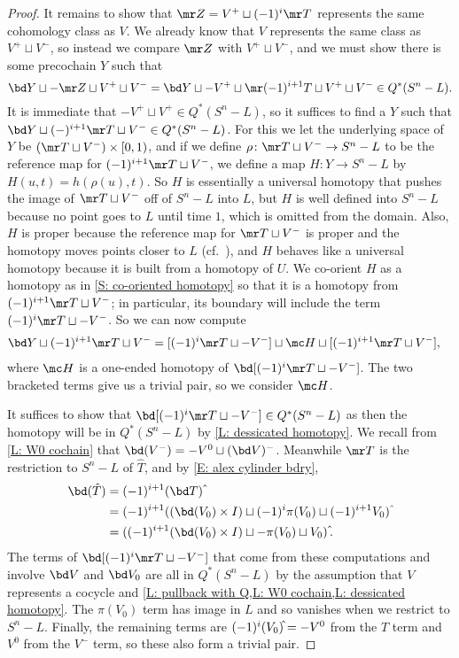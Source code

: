 \begin{example}
\begin{proof}
	It remains to show that $\mr Z = V^+ \sqcup (-1)^i\mr T$ represents the same cohomology class as $V$.
	We already know that $V$ represents the same class as $V^+ \sqcup V^-$, so instead we compare $\mr Z$ with $V^+ \sqcup V^-$, and we must show there is some precochain $Y$ such that
	$$\bd Y \sqcup -\mr Z\sqcup V^+\sqcup V^- = \bd Y \sqcup -V^+ \sqcup \mr (-1)^{i+1}T \sqcup V^+ \sqcup V^- \in Q^*(S^n-L).$$
	It is immediate that $-V^+ \sqcup V^+ \in Q^*(S^n-L)$, so it suffices to find a $Y$ such that
	$\bd Y \sqcup (-)^{i+1} \mr T \sqcup V^- \in Q^*(S^n-L)$.
	For this we let the underlying space of $Y$ be $(\mr T \sqcup V^-) \times [0,1)$, and if we define $\rho \colon \mr T \sqcup V^- \to S^n -L$ to be the reference map for $(-1)^{i+1}\mr T \sqcup V^-$, we define a map $H \colon Y \to S^n-L$ by $H(u,t) = h(\rho(u),t)$.
	So $H$ is essentially a universal homotopy that pushes the image of $\mr T \sqcup V^-$ off of $S^n-L$ into $L$, but $H$ is well defined into $S^n-L$ because no point goes to $L$ until time $1$, which is omitted from the domain.
	Also, $H$ is proper because the reference map for $\mr T \sqcup V^-$ is proper and the homotopy moves points closer to $L$ (cf.\ \cite[Corollory I.10.3.7]{Bou98}), and $H$ behaves like a universal homotopy because it is built from a homotopy of $U$.
	We co-orient $H$ as a homotopy as in \cref{S: co-oriented homotopy} so that it is a homotopy from $(-1)^{i+1}\mr T \sqcup V^-$; in particular, its boundary will include the term $(-1)^{i}\mr T \sqcup - V^-$.
	So we can now compute
	\begin{align*}
	\bd Y \sqcup (-1)^{i+1} \mr T \sqcup V^-
	&= [(-1)^{i}\mr T \sqcup - V^-] \sqcup \mc H \sqcup [(-1)^{i+1} \mr T \sqcup V^-],
	\end{align*}
	where $\mc H$ is a one-ended homotopy of $\bd[ (-1)^i\mr T \sqcup - V^-]$.
	The two bracketed terms give us a trivial pair, so we consider
	$\mc H$.

	It suffices to show that $\bd[(-1)^i\mr T \sqcup - V^-] \in Q^*(S^n-L)$ as then the homotopy will be in $Q^*(S^n-L)$ by \cref{L: dessicated homotopy}.
	We recall from \cref{L: W0 cochain} that $\bd(V^-) = -V^0 \sqcup (\bd V)^-$.
	Meanwhile $\mr T$ is the restriction to $S^n - L$ of $\hat T$, and by \eqref{E: alex cylinder bdry},
	\begin{align*}
		\bd (\hat T) &= (-1)^{i+1}(\bd T)\,\hat{\vrule height1.3ex width0pt}\\
		&=(-1)^{i+1}((\bd (V_0) \times I) \sqcup (-1)^i\pi(V_0)\sqcup (-1)^{i+1} V_0)\,\hat{\vrule height1.3ex width0pt}\\
	&=((-1)^{i+1}(\bd (V_0) \times I) \sqcup -\pi(V_0)\sqcup V_0)\,\hat{\vrule height1.3ex width0pt}.
	\end{align*}
	The terms of $\bd[ (-1)^i\mr T \sqcup - V^-]$ that come from these computations and involve $\bd V$ and $\bd V_0$ are all in $Q^*(S^n-L)$ by the assumption that $V$ represents a cocycle and \cref{L: pullback with Q,L: W0 cochain,L: dessicated homotopy}.
	The $\pi(V_0)$ term has image in $L$ and so vanishes when we restrict to $S^n - L$.
	Finally, the remaining terms are $(-1)^i(V_0)\hat{\vrule height1.3ex width0pt} = -V^0$ from the $T$ term and $V^0$ from the $V^-$ term, so these also form a trivial pair.


\end{proof}
\end{example}
